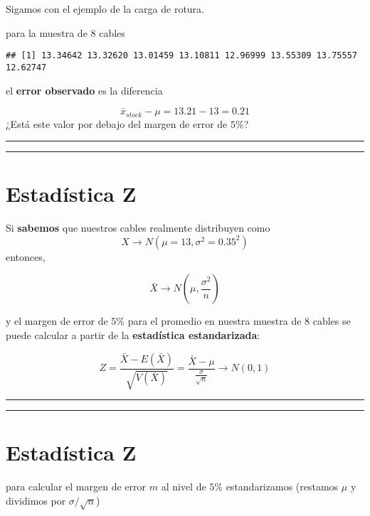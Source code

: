 \documentclass[
]{book}
\begin{document}
Sigamos con el ejemplo de la carga de rotura.

para la muestra de \(8\) cables

\begin{verbatim}
## [1] 13.34642 13.32620 13.01459 13.10811 12.96999 13.55309 13.75557 12.62747
\end{verbatim}

el \textbf{error observado} es la diferencia

\[\bar{x}_{stock}-\mu=13.21-13=0.21\]
¿Está este valor por debajo del margen de error de \(5\%\)?

\begin{center}\rule{0.5\linewidth}{0.5pt}\end{center}

\begin{center}\rule{0.5\linewidth}{0.5pt}\end{center}

\hypertarget{estaduxedstica-z}{%
\section{Estadística Z}\label{estaduxedstica-z}}

Si \textbf{sabemos} que nuestros cables realmente distribuyen como
\[X \rightarrow N(\mu=13, \sigma^2=0.35^2)\] entonces,

\[\bar{X} \rightarrow N(\mu, \frac{\sigma^2}{n})\]

y el margen de error de \(5\%\) para el promedio en nuestra muestra de \(8\) cables se puede calcular a partir de la \textbf{estadística estandarizada}:

\[Z=\frac{\bar{X}-E(\bar{X})}{\sqrt{V(\bar{X})}} =\frac{\bar{X}-\mu}{ \frac{\sigma}{\sqrt{n}}} \rightarrow N(0,1)\]

\begin{center}\rule{0.5\linewidth}{0.5pt}\end{center}

\begin{center}\rule{0.5\linewidth}{0.5pt}\end{center}

\hypertarget{estaduxedstica-z-1}{%
\section{Estadística Z}\label{estaduxedstica-z-1}}

para calcular el margen de error \(m\) al nivel de \(5\%\) estandarizamos (restamos \(\mu\) y dividimos por \(\sigma/\sqrt{n}\))
\end{document}
